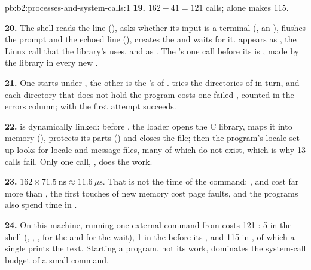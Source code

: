 \begin{solution}{pb:b2:processes-and-system-calls:1}
\textbf{19.} $162 - 41 = 121$ calls;  alone makes 115.

\textbf{20.} The shell reads the line (), asks whether its input is a terminal (, an
), flushes the prompt and the echoed line (), creates the  and waits for it. 
appears as , the Linux call that the library's  uses, and  as . The
's one call before its  is , made by the library in every new .

\textbf{21.} One  starts  under , the other is the 's  of
.  tries the directories of  in turn, and each directory that does not
hold the program costs one failed , counted in the errors column; with  the first
attempt succeeds.

\textbf{22.}  is dynamically linked: before , the loader opens the C library, maps it into
memory (), protects its parts () and closes the file; then the program's locale set-up
looks for locale and message files, many of which do not exist, which is why 13  calls fail. Only one
call, , does the work.

\textbf{23.} $162 \times 71.5\ \text{ns} \approx 11.6\ \mu\text{s}$. That is not the time of the command:
,  and  cost far more than , the first touches of new memory cost
page faults, and the programs also spend time in .

\textbf{24.} On this machine, running one external command from  costs 121 : 5 in the shell
(, , ,  for the  and  for the wait), 1 in the 
before its , and 115 in , of which a single  prints the text. Starting a program, not its
work, dominates the system-call budget of a small command.
\end{solution}
